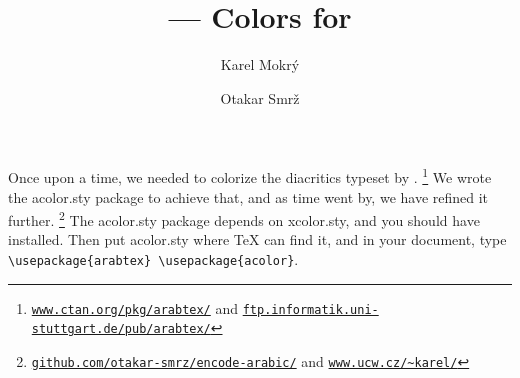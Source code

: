 \documentclass[10pt,a4paper]{article}
\title{\sty{acolor} --- Colors for \ArabTeX}
\author{Karel Mokr\'{y} \and Otakar Smr\v{z}}
\newcommand{\sty}[1]{\textsf{#1.sty}}
\newcommand{\hrefurl}[2]{\href{#1}{\nolinkurl{#2}}}
\begin{document}
\maketitle

\thispagestyle{empty}

\noindent
Once upon a time, we needed to colorize the diacritics typeset by
\ArabTeX.%
\footnote{\hrefurl{http://www.ctan.org/pkg/arabtex/}
                  {www.ctan.org/pkg/arabtex/} and
          \hrefurl{ftp://ftp.informatik.uni-stuttgart.de/pub/arabtex/arabtex.html}
                  {ftp.informatik.uni-stuttgart.de/pub/arabtex/}}
We wrote the \sty{acolor} package to achieve that, and as time went
by, we have refined it further.%
\footnote{\hrefurl{http://github.com/otakar-smrz/encode-arabic/}
                  {github.com/otakar-smrz/encode-arabic/} and
          \hrefurl{http://www.ucw.cz/~karel/}{www.ucw.cz/~karel/}}
The \sty{acolor} package depends on \sty{xcolor}, and you should have
\ArabTeX{} installed. Then put \sty{acolor} where \TeX{} can find it,
and in your document, type \lstinline!\usepackage{arabtex} \usepackage{acolor}!.
\end{document}
